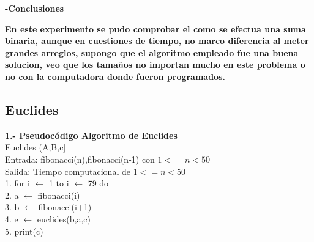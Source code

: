 \documentclass[spanish]{article}
\begin{document}
	{\large {\bf -Conclusiones}}\\
	{\bf En este experimento se pudo comprobar el como se efectua una suma binaria, aunque en cuestiones de tiempo, no marco diferencia al meter grandes arreglos, supongo que el algoritmo empleado fue una buena solucion, veo que los tamaños no importan mucho en este problema o no con la computadora donde fueron programados. \\

	\newpage
	\subsection{Euclides}
	{\large{\bf1.- Pseudoc\'odigo Algoritmo de Euclides}}\\
	Euclides (A,B,c]\\
Entrada: fibonacci(n),fibonacci(n-1) con $1<=n<50$\\
Salida: Tiempo computacional de $1<=n<50$\\
1.  for i $\leftarrow$ 1 to i $\leftarrow$ 79 do\\
2.      \hspace{0.7cm}a $\leftarrow$ fibonacci(i)\\
3.      \hspace{0.7cm}b $\leftarrow$ fibonacci(i+1)\\
4.      \hspace{0.7cm}e $\leftarrow$ euclides(b,a,c)\\
5.	   \hspace{0.7cm}print(c)\\

\bigskip

}
\end{document}
